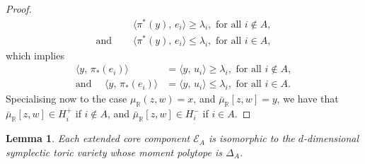 \documentclass{amsart}
\newtheorem{lemma}[theorem]{Lemma}
\newcommand{\RR}{\mathbb{R}}
\newcommand{\mcE}{\mathcal{E}}
\begin{document}
\begin{proof}
		\begin{align*}
			&\langle \pi^{\ast}(y),\, e_{i} \rangle \geq \lambda_{i}, \text{ for all } i \not\in A, \\
			\text{and } \quad  &\langle \pi^{\ast}(y), \, e_{i} \rangle \leq \lambda_{i}, \text{ for all } i \in A,
		\end{align*}
		which implies
		\begin{align*}
		\langle y,\, \pi_{\ast}(e_{i}) \rangle &= \langle y,\, u_{i} \rangle \geq \lambda_{i}, \text{ for all } i \not\in A, \\
		\text{and } \quad  \langle y,\, \pi_{\ast}(e_{i}) \rangle &= \langle y,\, u_{i} \rangle \leq \lambda_{i}, \text{ for all } i \in A.
		\end{align*}
		Specialising now to the case $\mu_{\RR}(z,w) = x$, and $\bar{\mu}_{\RR}[z,w] = y$, we have that $\bar{\mu}_{\RR}[z,w] \in H_{i}^{+}$ if $i \not\in A$, and $\bar{\mu}_{\RR}[z,w] \in H_{i}^{-}$ if $i \in A$.
	\end{proof}

	\begin{lemma}
		Each extended core component $\mcE_{A}$ is isomorphic to the $d$-dimensional symplectic toric variety whose moment polytope is $\Delta_{A}$.
	\end{lemma}
\end{document}
